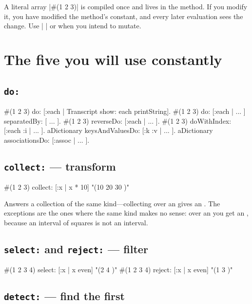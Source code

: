 \begin{stwarn}
A literal array \ct|#(1 2 3)| is compiled once and lives in the method. If you
modify it, you have modified the method's constant, and every later evaluation
sees the change. Use \ct|{ }| or  when you intend to mutate.
\end{stwarn}

\section{The five you will use constantly}

\subsection{\texttt{do:}}

\begin{st}
#(1 2 3) do: [:each | Transcript show: each printString].
#(1 2 3) do: [:each | ... ] separatedBy: [ ... ].
#(1 2 3) reverseDo: [:each | ... ].
#(1 2 3) doWithIndex: [:each :i | ... ].
aDictionary keysAndValuesDo: [:k :v | ... ].
aDictionary associationsDo: [:assoc | ... ].
\end{st}

\subsection{\texttt{collect:} --- transform}

\begin{st}
#(1 2 3) collect: [:x | x * 10]        "(10 20 30 )"
\end{st}

Answers a collection of the same kind---collecting over an
 gives an . The exceptions are the
ones where the same kind makes no sense: over an  you get an
, because an interval of squares is not an interval.

\subsection{\texttt{select:} and \texttt{reject:} --- filter}

\begin{st}
#(1 2 3 4) select: [:x | x even]        "(2 4 )"
#(1 2 3 4) reject: [:x | x even]        "(1 3 )"
\end{st}

\subsection{\texttt{detect:} --- find the first}

